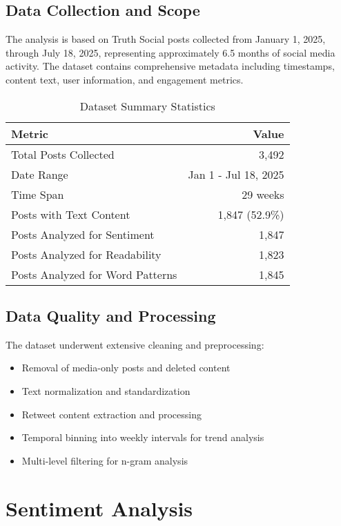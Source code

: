 \documentclass[12pt,a4paper]{article}
\begin{document}
\subsection{Data Collection and Scope}

The analysis is based on Truth Social posts collected from January 1, 2025, through July 18, 2025, representing approximately 6.5 months of social media activity. The dataset contains comprehensive metadata including timestamps, content text, user information, and engagement metrics.

\begin{table}[h!]
\centering
\caption{Dataset Summary Statistics}
\begin{tabular}{@{}lr@{}}
\toprule
\textbf{Metric} & \textbf{Value} \\
\midrule
Total Posts Collected & 3,492 \\
Date Range & Jan 1 - Jul 18, 2025 \\
Time Span & 29 weeks \\
Posts with Text Content & 1,847 (52.9\%) \\
Posts Analyzed for Sentiment & 1,847 \\
Posts Analyzed for Readability & 1,823 \\
Posts Analyzed for Word Patterns & 1,845 \\
\bottomrule
\end{tabular}
\end{table}

\subsection{Data Quality and Processing}

The dataset underwent extensive cleaning and preprocessing:
\begin{itemize}
    \item Removal of media-only posts and deleted content
    \item Text normalization and standardization
    \item Retweet content extraction and processing
    \item Temporal binning into weekly intervals for trend analysis
    \item Multi-level filtering for n-gram analysis
\end{itemize}

\section{Sentiment Analysis}
\end{document}
